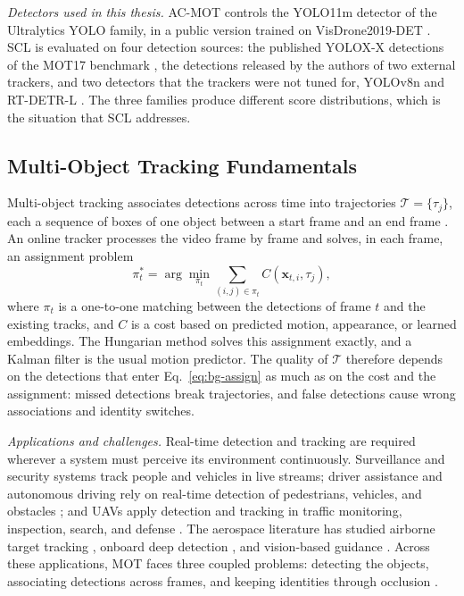 \emph{Detectors used in this thesis.} AC-MOT controls the YOLO11m detector \cite{jocher2024yolo11} of the Ultralytics YOLO family, in a public version trained on VisDrone2019-DET \cite{zhu2022visdrone}. SCL is evaluated on four detection sources: the published YOLOX-X detections of the MOT17 benchmark \cite{ge2021yolox}, the detections released by the authors of two external trackers, and two detectors that the trackers were not tuned for, YOLOv8n \cite{jocher2023yolov8} and RT-DETR-L \cite{zhao2024rtdetr}. The three families produce different score distributions, which is the situation that SCL addresses.

\subsection{Multi-Object Tracking Fundamentals}\label{sec:bg-mot}
Multi-object tracking associates detections across time into trajectories $\mathcal{T}=\{\tau_j\}$, each a sequence of boxes of one object between a start frame and an end frame \cite{ismail2026realtime}. An online tracker processes the video frame by frame and solves, in each frame, an assignment problem
\begin{equation}
\pi_t^{*} = \arg\min_{\pi_t} \sum_{(i,j)\in\pi_t} C\left(\mathbf{x}_{t,i}, \tau_j\right),
\label{eq:bg-assign}
\end{equation}
where $\pi_t$ is a one-to-one matching between the detections of frame $t$ and the existing tracks, and $C$ is a cost based on predicted motion, appearance, or learned embeddings. The Hungarian method \cite{kuhn1955hungarian} solves this assignment exactly, and a Kalman filter \cite{kalman1960} is the usual motion predictor. The quality of $\mathcal{T}$ therefore depends on the detections that enter Eq.~\eqref{eq:bg-assign} as much as on the cost and the assignment: missed detections break trajectories, and false detections cause wrong associations and identity switches.

\emph{Applications and challenges.} Real-time detection and tracking are required wherever a system must perceive its environment continuously. Surveillance and security systems track people and vehicles in live streams; driver assistance and autonomous driving rely on real-time detection of pedestrians, vehicles, and obstacles \cite{geiger2012kitti}; and UAVs apply detection and tracking in traffic monitoring, inspection, search, and defense \cite{zhu2022visdrone,bakirci2025lowpower}. The aerospace literature has studied airborne target tracking \cite{miller2015multitarget,desai2017uavfeature}, onboard deep detection \cite{lu2024uavdetection,choi2022docking}, and vision-based guidance \cite{parsons2019refueling}. Across these applications, MOT faces three coupled problems: detecting the objects, associating detections across frames, and keeping identities through occlusion \cite{li2025motreview,ismail2026realtime}.

